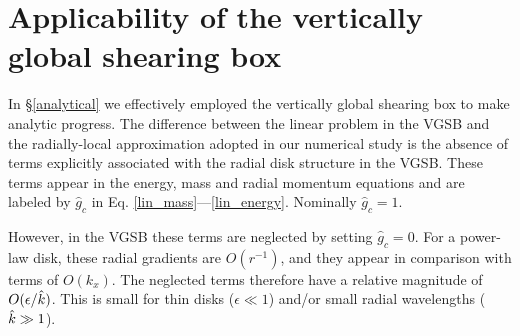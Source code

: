 \section{Applicability of the vertically global shearing box}\label{global_corr}
In \S\ref{analytical} we effectively employed the vertically global shearing box
\citep[VGSB,][]{mcnally14} to make analytic progress.   
The difference between the linear problem in the VGSB 
and the radially-local approximation adopted in our numerical study
is the absence of terms explicitly associated with the radial disk structure in
the VGSB. These terms appear in the energy, mass and radial momentum
equations and are labeled by $\hat{g}_c$ in
Eq. \ref{lin_mass}---\ref{lin_energy}. Nominally $\hat{g}_c=1$.  


However, in the VGSB these terms are neglected by 
setting $\hat{g}_c=0$. For a power-law disk, these radial gradients
are $O(r^{-1})$, and they appear in comparison with terms of
$O(k_x)$. The neglected terms therefore have a relative magnitude of
$O(\epsilon/\hat{k})$. This is small for thin disks ($\epsilon\ll1$)
and/or small radial wavelengths ($\hat{k}\gg 1$).  


